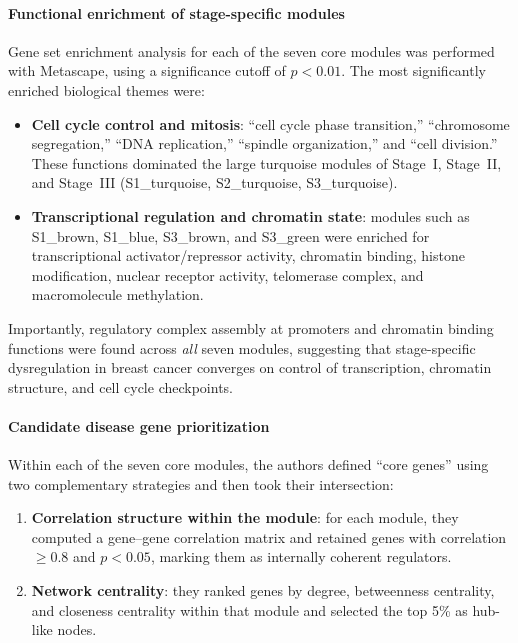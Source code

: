 \documentclass[10pt]{extarticle}
\begin{document}
\paragraph{Functional enrichment of stage-specific modules}
Gene set enrichment analysis for each of the seven core modules was performed with Metascape, using a significance cutoff of $p<0.01$. The most significantly enriched biological themes were:
\begin{itemize}[label=-]
    \item \textbf{Cell cycle control and mitosis}: ``cell cycle phase transition,'' ``chromosome segregation,'' ``DNA replication,'' ``spindle organization,'' and ``cell division.'' These functions dominated the large turquoise modules of Stage~I, Stage~II, and Stage~III (S1\_turquoise, S2\_turquoise, S3\_turquoise).
    \item \textbf{Transcriptional regulation and chromatin state}: modules such as S1\_brown, S1\_blue, S3\_brown, and S3\_green were enriched for transcriptional activator/repressor activity, chromatin binding, histone modification, nuclear receptor activity, telomerase complex, and macromolecule methylation.
\end{itemize}

Importantly, regulatory complex assembly at promoters and chromatin binding functions were found across \textit{all} seven modules, suggesting that stage-specific dysregulation in breast cancer converges on control of transcription, chromatin structure, and cell cycle checkpoints.

\paragraph{Candidate disease gene prioritization}
Within each of the seven core modules, the authors defined ``core genes'' using two complementary strategies and then took their intersection:
\begin{enumerate}
    \item \textbf{Correlation structure within the module}: for each module, they computed a gene--gene correlation matrix and retained genes with correlation $\ge 0.8$ and $p<0.05$, marking them as internally coherent regulators.
    \item \textbf{Network centrality}: they ranked genes by degree, betweenness centrality, and closeness centrality within that module and selected the top 5\% as hub-like nodes.
\end{enumerate}
\end{document}
